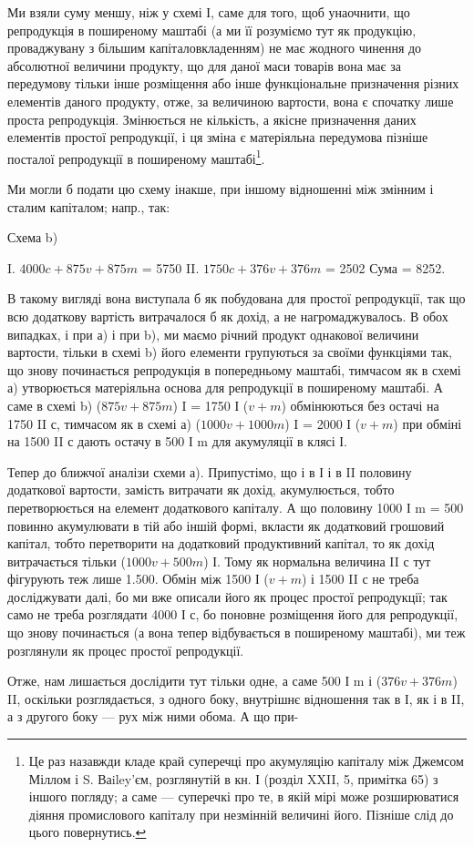\parcont{}  %
Ми взяли суму меншу, ніж у схемі І, саме для того, щоб унаочнити,
що репродукція в поширеному маштабі (а ми її розуміємо тут як продукцію,
проваджувану з більшим капіталовкладенням) не має жодного
чинення до абсолютної величини продукту, що для даної маси товарів
вона має за передумову тільки інше розміщення або інше функціональне
призначення різних елементів даного продукту, отже, за величиною вартости,
вона є спочатку лише проста репродукція. Змінюється не кількість,
а якісне призначення даних елементів простої репродукції, і ця зміна є
матеріяльна передумова пізніше посталої репродукції в поширеному
маштабі\footnote{
Це раз назавжди кладе край суперечці про акумуляцію капіталу між Джемсом
Міллом і S. Ваiley’єм, розглянутій в кн. І (розділ XXII, 5, примітка 65) з іншого
погляду; а саме — суперечкі про те, в якій мірі може розширюватися діяння промислового
капіталу при незмінній величині його. Пізніше слід до цього повернутись.
}.

Ми могли б подати цю схему інакше, при іншому відношенні між
змінним і сталим капіталом; напр., так:

Схема b)

I. $4000 c + 875 v + 875 m$ = 5750
II. $1750 c + 376 v + 376 m$ = 2502 Сума = 8252.

В такому вигляді вона виступала б як побудована для простої репродукції,
так що всю додаткову вартість витрачалося б як дохід, а не нагромаджувалось.
В обох випадках, і при а) і при b), ми маємо річний
продукт однакової величини вартости, тільки в схемі b) його елементи
групуються за своїми функціями так, що знову починається репродукція
в попередньому маштабі, тимчасом як в схемі а) утворюється матеріяльна
основа для репродукції в поширеному маштабі. А саме в схемі b)
($875 v + 875 m$) I = 1750 І ($v + m$) обмінюються без остачі на
1750 II с, тимчасом як в схемі а) ($1000 v + 1000 m$) I = 2000 І
($v + m$) при обміні на 1500 II с дають остачу в 500 І m для акумуляції
в клясі І.

Тепер до ближчої аналізи схеми а). Припустімо, що і в І і в II половину
додаткової вартости, замість витрачати як дохід, акумулюється, тобто
перетворюється на елемент додаткового капіталу. А що половину 1000
І m = 500 повинно акумулювати в тій або іншій формі, вкласти як додатковий
грошовий капітал, тобто перетворити на додатковий продуктивний
капітал, то як дохід витрачається тільки ($1000 v + 500 m$) І. Тому
як нормальна величина II с тут фігурують теж лише 1.500. Обмін між
1500 І ($v + m$) і 1500 II с не треба досліджувати далі, бо ми вже описали
його як процес простої репродукції; так само не треба розглядати
4000 І с, бо поновне розміщення його для репродукції, що знову починається
(а вона тепер відбувається в поширеному маштабі), ми теж розглянули
як процес простої репродукції.

Отже, нам лишається дослідити тут тільки одне, а саме 500 І m і
($376 v + 376 m$) II, оскільки розглядається, з одного боку, внутрішнє відношення
так в І, як і в II, а з другого боку — рух між ними обома. А що при-
\parbreak{}  %

